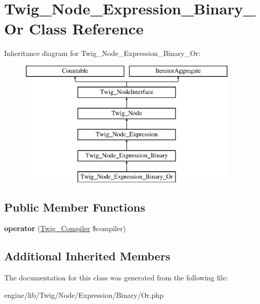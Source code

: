 \hypertarget{class_twig___node___expression___binary___or}{}\section{Twig\+\_\+\+Node\+\_\+\+Expression\+\_\+\+Binary\+\_\+\+Or Class Reference}
\label{class_twig___node___expression___binary___or}
Inheritance diagram for Twig\+\_\+\+Node\+\_\+\+Expression\+\_\+\+Binary\+\_\+\+Or\+:\begin{figure}[H]
\begin{center}
\leavevmode
\includegraphics[height=6.000000cm]{class_twig___node___expression___binary___or}
\end{center}
\end{figure}
\subsection*{Public Member Functions}
\begin{DoxyCompactItemize}
\item 
\hypertarget{class_twig___node___expression___binary___or_af77318ec88d5f8a508684970a150b670}{}{\bfseries operator} (\hyperlink{class_twig___compiler}{Twig\+\_\+\+Compiler} \$compiler)\label{class_twig___node___expression___binary___or_af77318ec88d5f8a508684970a150b670}

\end{DoxyCompactItemize}
\subsection*{Additional Inherited Members}


The documentation for this class was generated from the following file\+:\begin{DoxyCompactItemize}
\item 
engine/lib/\+Twig/\+Node/\+Expression/\+Binary/Or.\+php\end{DoxyCompactItemize}
